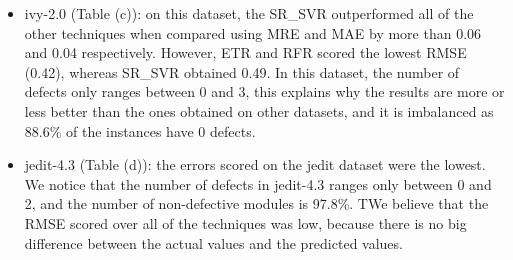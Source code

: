 \documentclass[]{article}
\begin{document}
	\FloatBarrier
	\begin{itemize}
		\item ivy-2.0 (Table (c)): on this dataset, the SR\_SVR outperformed all of the other techniques when compared using MRE and MAE by more than 0.06 and 0.04 respectively. However, ETR and RFR scored the lowest RMSE (0.42), whereas SR\_SVR obtained 0.49. In this dataset, the number of defects only ranges between 0 and 3, this explains why the results are more or less better than the ones obtained on other datasets, and it is imbalanced as 88.6\% of the instances have 0 defects.
		\item jedit-4.3 (Table (d)): the errors scored on the jedit dataset were the lowest. We notice that the number of defects in jedit-4.3 ranges only between 0 and 2, and the number of non-defective modules is 97.8\%. TWe believe that the RMSE scored over all of the techniques was low, because there is no big difference between the actual values and the predicted values. 
	\end{itemize}
	\FloatBarrier
\end{document}
